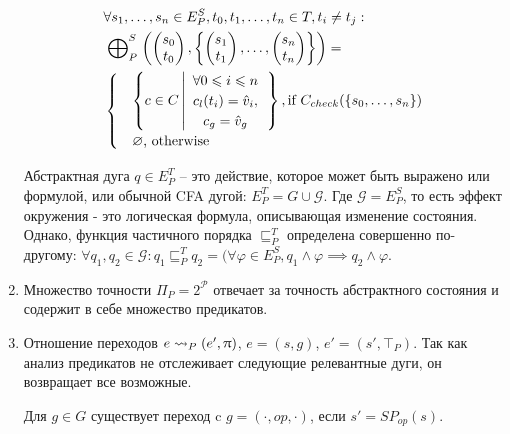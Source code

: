 \begin{enumerate}
\begin{equation}
\label{predicate_epp_def}
\begin{aligned}
&\forall s_1, \dots, s_n \in E^S_P, t_0, t_1,\dots,t_n \in T, t_i \neq t_j:\\
& \mathrel{\bigoplus}^S_P
\left(
\begin{pmatrix}
s_0 \\
t_0 
\end{pmatrix},
\left\{
\begin{pmatrix}
s_1 \\
t_1 
\end{pmatrix},
\dots ,
\begin{pmatrix}
s_n \\
t_n 
\end{pmatrix}
\right\}
\right)= \\
& \begin{cases}
& \left\lbrace 
c \in C 
\left| 
\begin{array}{c}
\forall 0 \leqslant i \leqslant n \\
c_{l}(t_i)=\hat v_i, \\
c_g=\hat v_g
\end{array}
\right.
\right\rbrace, \mbox{if } C_{check}(\{s_0,\dots, s_n\})\\
& \varnothing \mbox{, otherwise}
\end{cases}
\end{aligned}
\end{equation}

Абстрактная дуга $q \in E^T_P$ – это действие, которое может быть выражено или формулой, или обычной CFA дугой: $E^T_P = G \cup \mathcal{G}$.
Где $\mathcal{G}=E^S_P$, то есть эффект окружения - это логическая формула, описывающая изменение состояния.
Однако, функция частичного порядка $\sqsubseteq^T_P$ определена совершенно по-другому: $\forall q_1, q_2 \in \mathcal{G}: q_1 \sqsubseteq^T_P q_2 = (\forall \varphi \in E^S_P, q_1 \land \varphi \implies q_2 \land \varphi$.

\item Множество точности $\Pi_P = 2^\mathscr{P}$ отвечает за точность абстрактного состояния и содержит в себе множество предикатов.

\item Отношение переходов $e \leadsto_P (e',\uppi)$, $e = (s, g)$, $e' = (s', \top_P)$. 
Так как анализ предикатов не отслеживает следующие релевантные дуги, он возвращает все возможные. 

Для $g \in G$ существует переход c $g = (\cdot, op, \cdot)$, если $s' = SP_{op}(s)$.


\end{enumerate}

